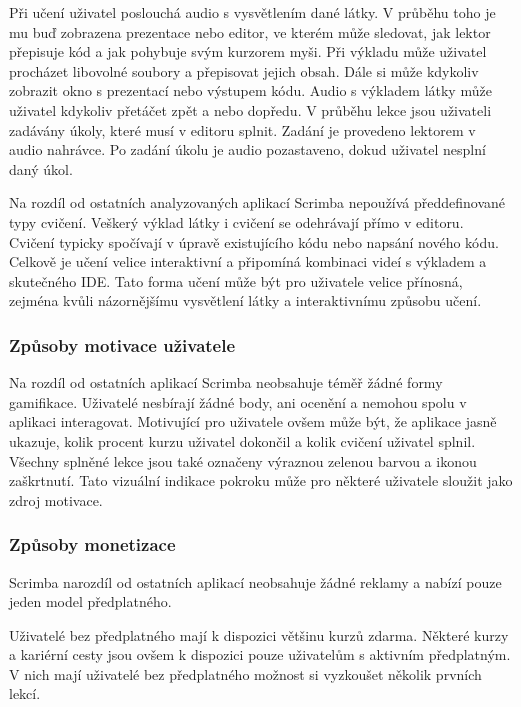 Při učení uživatel poslouchá audio s vysvětlením dané látky. V průběhu toho je mu buď zobrazena prezentace nebo editor, ve kterém může sledovat, jak lektor přepisuje kód a jak pohybuje svým kurzorem myši. Při výkladu může uživatel procházet libovolné soubory a přepisovat jejich obsah. Dále si může kdykoliv zobrazit okno s prezentací nebo výstupem kódu. Audio s výkladem látky může uživatel kdykoliv přetáčet zpět a nebo dopředu. V průběhu lekce jsou uživateli zadávány úkoly, které musí v editoru splnit. Zadání je provedeno lektorem v audio nahrávce. Po zadání úkolu je audio pozastaveno, dokud uživatel nesplní daný úkol. 

Na rozdíl od ostatních analyzovaných aplikací Scrimba nepoužívá předdefinované typy cvičení. Veškerý výklad látky i cvičení se odehrávají přímo v editoru. Cvičení typicky spočívají v úpravě existujícího kódu nebo napsání nového kódu. Celkově je učení velice interaktivní a připomíná kombinaci videí s výkladem a skutečného IDE. Tato forma učení může být pro uživatele velice přínosná, zejména kvůli názornějšímu vysvětlení látky a interaktivnímu způsobu učení. 

\subsubsection{Způsoby motivace uživatele}

Na rozdíl od ostatních aplikací Scrimba neobsahuje téměř žádné formy gamifikace. Uživatelé nesbírají žádné body, ani ocenění a nemohou spolu v aplikaci interagovat. Motivující pro uživatele ovšem může být, že aplikace jasně ukazuje, kolik procent kurzu uživatel dokončil a kolik cvičení uživatel splnil. Všechny splněné lekce jsou také označeny výraznou zelenou barvou a ikonou zaškrtnutí. Tato vizuální indikace pokroku může pro některé uživatele sloužit jako zdroj motivace. 

\subsubsection{Způsoby monetizace}

Scrimba narozdíl od ostatních aplikací neobsahuje žádné reklamy a nabízí pouze jeden model předplatného.

Uživatelé bez předplatného mají k dispozici většinu kurzů zdarma. Některé kurzy a kariérní cesty jsou ovšem k dispozici pouze uživatelům s aktivním předplatným. V nich mají uživatelé bez předplatného možnost si vyzkoušet několik prvních lekcí.

